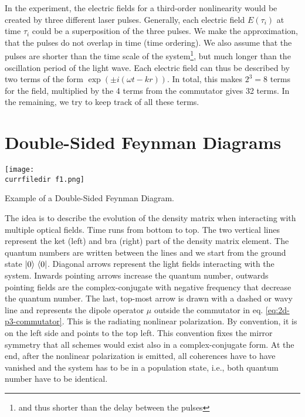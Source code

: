 In the experiment, the electric fields for a third-order nonlinearity would be created by three different laser pulses. Generally, each  electric field $E(\tau_i)$ at time $\tau_i$ could be a superposition of the three pulses. We make the approximation, that the pulses do not overlap in time (time ordering). We also assume that the pulses are shorter  than the time scale of the system\footnote{and thus shorter than the delay between the pulses}, but much longer than the oscillation period of the light wave. Each electric field can thus be described by two terms of the form $\exp( \pm i (\omega t - k r) )$. In total, this makes $2^3=8$ terms for the field, multiplied by the 4 terms from the commutator gives 32 terms.
In the remaining, we try to keep track of all these terms.


\section{Double-Sided Feynman Diagrams}

\begin{marginfigure}
\texttt{[image: \\currfiledir f1.png]}
\caption{
Example of a Double-Sided Feynman Diagram.}
\label{fig_2d_f1}
\end{marginfigure}

The idea is to describe the evolution of the density matrix when interacting with multiple optical fields.
Time runs from bottom to top. The two vertical lines represent the ket (left) and bra (right) part of the density matrix element. The quantum numbers are written between the lines and we start from the ground state $\ket{0}\, \bra{0}$. Diagonal arrows represent the light fields interacting with the system. Inwards pointing arrows increase the quantum number, outwards pointing fields are the complex-conjugate with negative frequency that decrease the quantum number. The last, top-most arrow is drawn with a dashed or wavy line and represents the dipole operator $\mu$ outside the commutator in eq. \ref{eq:2d-p3-commutator}. This is the radiating nonlinear polarization. By convention, it is on the left side and points to the top left. This convention fixes the mirror symmetry that all schemes would exist also in a complex-conjugate form. At the end, after the nonlinear polarization is emitted, all coherences have to have vanished and the system has to be in a population state, i.e., both quantum number have to be identical.



